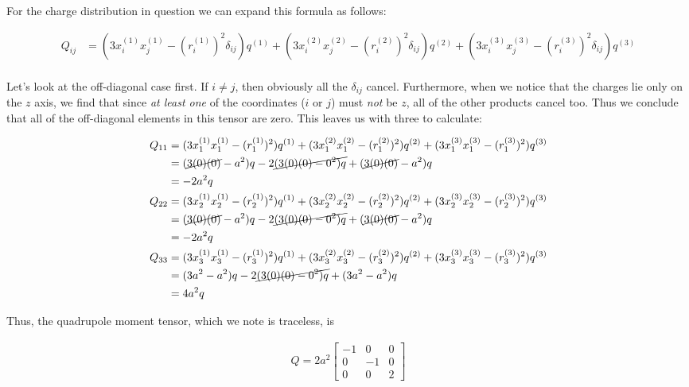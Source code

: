 \documentclass[paper=a4, fontsize=11pt]{scrartcl} %
\numberwithin{equation}{section} %
\numberwithin{figure}{section} %
\numberwithin{table}{section} %
\begin{document}
For the charge distribution in question we can expand this formula as follows:

\begin{align}
Q_{ij} &= (3x_i^{(1)}x_j^{(1)} - (r_i^{(1)})^2\delta_{ij})q^{(1)} + (3x_i^{(2)}x_j^{(2)} - (r_i^{(2)})^2\delta_{ij})q^{(2)} + (3x_i^{(3)}x_j^{(3)} - (r_i^{(3)})^2\delta_{ij})q^{(3)} \\
\end{align}

Let's look at the off-diagonal case first. If $i \neq j$, then obviously all the $\delta_{ij}$ cancel. Furthermore, when we notice that the charges lie only on the $z$ axis, we find that since \textit{at least one} of the coordinates ($i$ or $j$) must \textit{not} be $z$, all of the other products cancel too. Thus we conclude that all of the off-diagonal elements in this tensor are zero. This leaves us with three to calculate:

\begin{align}
Q_{11} &= (3x_1^{(1)}x_1^{(1)} - (r_1^{(1)})^2)q^{(1)} + (3x_1^{(2)}x_1^{(2)} - (r_1^{(2)})^2)q^{(2)} + (3x_1^{(3)}x_1^{(3)} - (r_1^{(3)})^2)q^{(3)} \\
&= (\cancel{3(0)(0)} - a^2)q - 2\cancel{(3(0)(0) - 0^2)q} + (\cancel{3(0)(0)} - a^2)q \\ 
&= -2a^2q \\
Q_{22} &= (3x_2^{(1)}x_2^{(1)} - (r_2^{(1)})^2)q^{(1)} + (3x_2^{(2)}x_2^{(2)} - (r_2^{(2)})^2)q^{(2)} + (3x_2^{(3)}x_2^{(3)} - (r_2^{(3)})^2)q^{(3)} \\
&= (\cancel{3(0)(0)} - a^2)q - 2\cancel{(3(0)(0) - 0^2)q} + (\cancel{3(0)(0)} - a^2)q \\
&= -2a^2q \\
Q_{33} &= (3x_3^{(1)}x_3^{(1)} - (r_3^{(1)})^2)q^{(1)} + (3x_3^{(2)}x_3^{(2)} - (r_3^{(2)})^2)q^{(2)} + (3x_3^{(3)}x_3^{(3)} - (r_3^{(3)})^2)q^{(3)} \\
&= (3a^2 - a^2)q - 2\cancel{(3(0)(0) - 0^2)q} + (3a^2 - a^2)q \\
&= 4a^2q
\end{align}

Thus, the quadrupole moment tensor, which we note is traceless, is 

\begin{align}
Q = 2a^2
\begin{bmatrix}
-1 & 0 & 0 \\
0 & -1 & 0 \\
0 & 0 & 2
\end{bmatrix}
\end{align}
\end{document}
